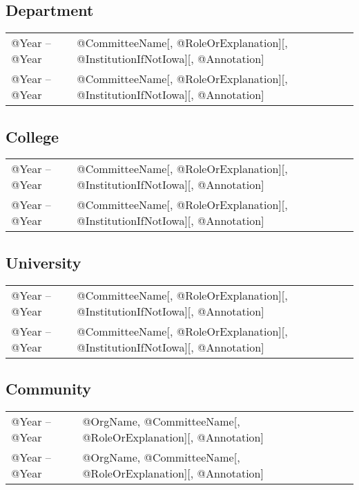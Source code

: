 \documentclass[10pt]{article}
\begin{document}
\begin{IOWA ONLY}
\subsection*{Department}

\begin{tabular}{l@{\quad\ }p{34em}} 
 @Year -- @Year 
 & @CommitteeName[, @RoleOrExplanation][, @InstitutionIfNotIowa][, @Annotation]
 \\[.5ex]
 @Year -- @Year 
 & @CommitteeName[, @RoleOrExplanation][, @InstitutionIfNotIowa][, @Annotation]
\end{tabular}

\subsection*{College}

\begin{tabular}{l@{\quad\ }p{34em}} 
 @Year -- @Year 
 & @CommitteeName[, @RoleOrExplanation][, @InstitutionIfNotIowa][, @Annotation]
 \\[.5ex]
 @Year -- @Year 
 & @CommitteeName[, @RoleOrExplanation][, @InstitutionIfNotIowa][, @Annotation]
\end{tabular}

\subsection*{University}

\begin{tabular}{l@{\quad\ }p{34em}} 
 @Year -- @Year 
 & @CommitteeName[, @RoleOrExplanation][, @InstitutionIfNotIowa][, @Annotation]
 \\[.5ex]
 @Year -- @Year 
 & @CommitteeName[, @RoleOrExplanation][, @InstitutionIfNotIowa][, @Annotation]
\end{tabular}

\subsection*{Community}

\begin{tabular}{l@{\quad\ }p{34em}} 
 @Year -- @Year 
 & @OrgName, @CommitteeName[, @RoleOrExplanation][, @Annotation]
 \\[.5ex]
 @Year -- @Year 
 & @OrgName, @CommitteeName[, @RoleOrExplanation][, @Annotation]
\end{tabular}


\end{IOWA ONLY}
\end{document}
